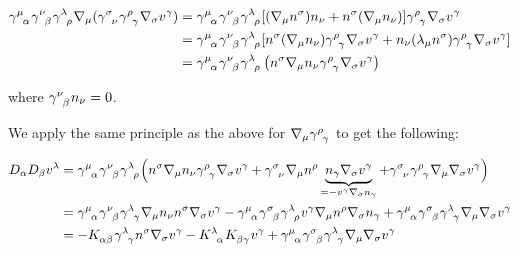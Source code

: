 \documentclass[12pt]{article}
\numberwithin{equation}{section}
\numberwithin{theorem}{subsection}
\begin{document}
\begin{align*}

   \tensor{\gamma}{^\mu_\alpha}\tensor{\gamma}{^\nu_\beta}\tensor{\gamma}{^\lambda_\rho}\nabla_{\mu}(\tensor{\gamma}{^\sigma_\nu}\tensor{\gamma}{^\rho_\gamma}\nabla_{\sigma}v^{\gamma}) &= \tensor{\gamma}{^\mu_\alpha}\tensor{\gamma}{^\nu_\beta}\tensor{\gamma}{^\lambda_\rho}[(\nabla_{\mu}n^{\sigma})n_{\nu} + n^{\sigma}(\nabla_{\mu}n_{\nu})]\tensor{\gamma}{^\rho_\gamma}\nabla_{\sigma}v^{\gamma} \\

   &= \tensor{\gamma}{^\mu_\alpha}\tensor{\gamma}{^\nu_\beta}\tensor{\gamma}{^\lambda_\rho}[n^{\sigma}(\nabla_{\mu}n_{\nu})\tensor{\gamma}{^\rho_\gamma}\nabla_{\sigma}v^{\gamma} + n_{\nu}(\lambda_{\mu}n^{\sigma})\tensor{\gamma}{^\rho_\gamma}\nabla_{\sigma}v^{\gamma}] \\

   &= \tensor{\gamma}{^\mu_\alpha}\tensor{\gamma}{^\nu_\beta}\tensor{\gamma}{^\lambda_\rho} \left(n^{\sigma}\nabla_{\mu}n_{\nu}\tensor{\gamma}{^\rho_\gamma}\nabla_{\sigma}v^{\gamma}\right)   

\end{align*} 

where $\tensor{\gamma}{^\nu_\beta}n_{\nu} = 0$.

\newline 

\smallskip

We apply the same principle as the above for $\nabla_{\mu}\tensor{\gamma}{^\rho_\gamma}$ to get the following:

\begin{align}

D_{\alpha}D_{\beta}v^{\lambda} &= \tensor{\gamma}{^\mu_\alpha}\tensor{\gamma}{^\nu_\beta}\tensor{\gamma}{^\lambda_\rho} \Big(n^{\sigma}\nabla_{\mu}n_{\nu}\tensor{\gamma}{^\rho_\gamma}\nabla_{\sigma}v^{\gamma} + \tensor{\gamma}{^\sigma_\nu}\nabla_{\mu}n^{\rho}\underbrace{n_{\gamma}\nabla_{\sigma}v^{\gamma}}_{= -v^{\gamma}\nabla_{\sigma}n_{\gamma}} + \tensor{\gamma}{^\sigma_\nu}\tensor{\gamma}{^\rho_\gamma}\nabla_{\mu}\nabla_{\sigma}v^{\gamma}\Big) \notag\\

&= \tensor{\gamma}{^\mu_\alpha}\tensor{\gamma}{^\nu_\beta}\tensor{\gamma}{^\lambda_\gamma}\nabla_{\mu}n_{\nu}n^{\sigma}\nabla_{\sigma}v^{\gamma}-\tensor{\gamma}{^\mu_\alpha}\tensor{\gamma}{^\sigma_\beta}\tensor{\gamma}{^\lambda_\rho}v^{\gamma}\nabla_{\mu}n^{\rho}\nabla_{\sigma}n_{\gamma}+\tensor{\gamma}{^\mu_\alpha}\tensor{\gamma}{^\sigma_\beta}\tensor{\gamma}{^\lambda_\gamma}\nabla_{\mu}\nabla_{\sigma}v^{\gamma} \notag \\

&= -\tensor{K}{_\alpha_\beta}\tensor{\gamma}{^\lambda_\gamma}n^{\sigma}\nabla_{\sigma}v^{\gamma}- \tensor{K}{^\lambda_\alpha}\tensor{K}{_\beta_\gamma}v^{\gamma}+\tensor{\gamma}{^\mu_\alpha}\tensor{\gamma}{^\sigma_\beta}\tensor{\gamma}{^\lambda_\gamma}\nabla_{\mu}\nabla_{\sigma}v^{\gamma}

\end{align}
\end{document}
